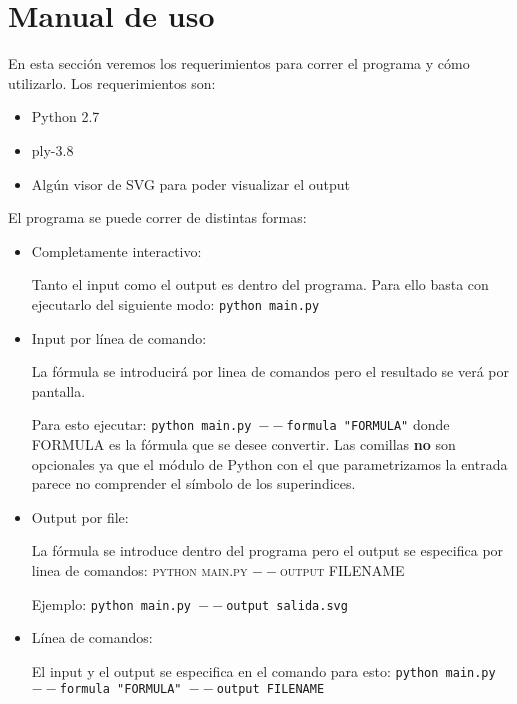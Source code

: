 \section{Manual de uso}
En esta secci\'on veremos los requerimientos para correr el programa y c\'omo utilizarlo. Los requerimientos son:

\begin{itemize}
  \item Python 2.7
  \item ply-3.8
  \item Alg\'un visor de SVG para poder visualizar el output
\end{itemize}

El programa se puede correr de distintas formas:

\begin{itemize}
  \item {
  	\par Completamente interactivo:
  	\par Tanto el input como el output es dentro del programa. Para ello basta con ejecutarlo del siguiente modo: \texttt{python main.py}
  	}
  \item {
  	\par Input por l\'inea de comando:
  	\par La f\'ormula se introducir\'a por linea de comandos pero el resultado se ver\'a por pantalla.
  	\par Para esto ejecutar: \texttt{python main.py $--$formula "FORMULA"} donde FORMULA es la f\'ormula que se desee convertir. Las comillas \textbf{no} son opcionales ya que el m\'odulo de Python con el que parametrizamos la entrada parece no comprender el s\'imbolo de los superindices.
  }
  \item {
  	\par Output por file: 
  	\par La f\'ormula se introduce dentro del programa pero el output se especifica por linea de comandos: \textsc{python main.py $--$output FILENAME} 
  	\par Ejemplo: \texttt{python main.py $--$output salida.svg}
  }
  \item {
  	\par L\'inea de comandos: 
  	\par El input y el output se especifica en el comando para esto: \texttt{python main.py $--$formula "FORMULA" $--$output FILENAME}
  }
\end{itemize}
